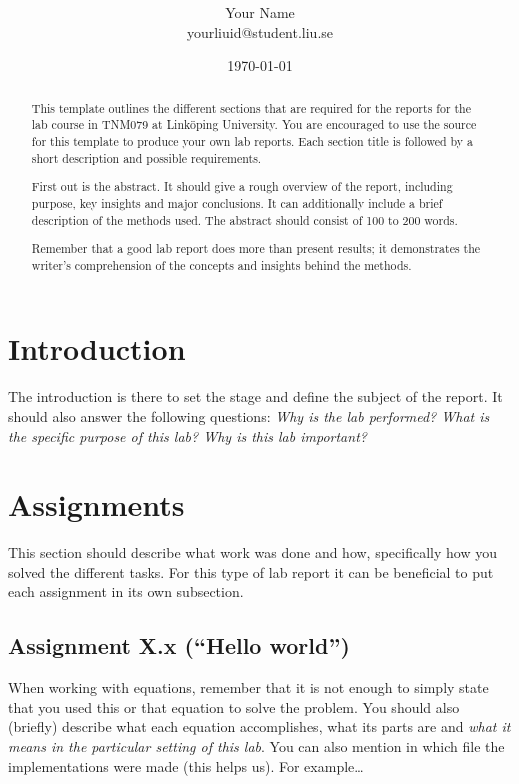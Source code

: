 \documentclass[onecolumn]{article}
\title{\spacecaps{Lab report: Lab 0 }\\ \normalsize \spacesc{TNM079, Modeling and Animation} }
\author{Your Name\\yourliuid@student.liu.se}
\date{\today}
\begin{document}
\maketitle

\begin{abstract}
This template outlines the different sections that are required for the reports for the lab course in TNM079 at Link\"oping University. You are encouraged to use the source for this template to produce your own lab reports. Each section title is followed by a short description and possible requirements.

First out is the abstract. It should give a rough overview of the report, including purpose, key insights and major conclusions. It can additionally include a brief description of the methods used. The abstract should consist of 100 to 200 words.

Remember that a good lab report does more than present results; it demonstrates the writer's comprehension of the concepts and insights behind the methods.
\end{abstract}


\section{Introduction}
The introduction is there to set the stage and define the subject of the report. It should also answer the following questions: \emph{Why is the lab performed? What is the specific purpose of this lab? Why is this lab important?}

\section{Assignments}
This section should describe what work was done and how, specifically how you solved the different tasks. For this type of lab report it can be beneficial to put each assignment in its own subsection.

\subsection{Assignment X.x (``Hello world'')}

When working with equations, remember that it is not enough to simply state that you used this or that equation to solve the problem. You should also (briefly) describe what each equation accomplishes, what its parts are and \emph{what it means in the particular setting of this lab}. You can also mention in which file the implementations were made (this helps us). For example\dots
\end{document}
